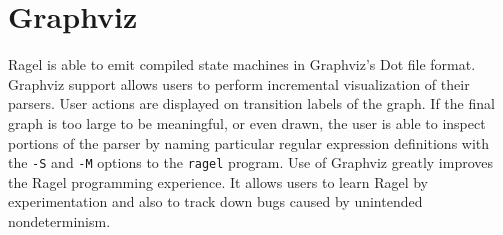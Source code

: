 \documentclass[letterpaper,11pt,oneside]{book}
\begin{document}
\section{Graphviz}

Ragel is able to emit compiled state machines in Graphviz's Dot file format.
Graphviz support allows users to perform
incremental visualization of their parsers. User actions are displayed on
transition labels of the graph. If the final graph is too large to be
meaningful, or even drawn, the user is able to inspect portions of the parser
by naming particular regular expression definitions with the \verb|-S| and
\verb|-M| options to the \verb|ragel| program. Use of Graphviz greatly
improves the Ragel programming experience. It allows users to learn Ragel by
experimentation and also to track down bugs caused by unintended
nondeterminism.
\end{document}
